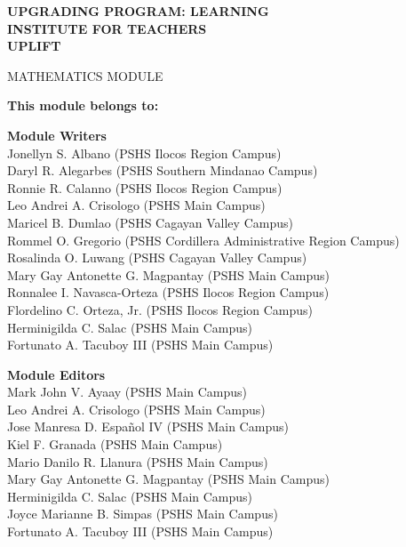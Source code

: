\documentclass[svgnames,a4paper]{report}
\begin{document}
\begin{titlepage}
\begin{center}
\bfseries
{\LARGE UPGRADING PROGRAM: LEARNING}\\[24pt]
{\LARGE INSTITUTE FOR TEACHERS}\\[24pt]
{\LARGE UPLIFT}
\vfill

{\LARGE MATHEMATICS MODULE}
\vfill

\textbf{This module belongs to:}\\[24pt]

\noindent
\hrulefill
\end{center}
\newpage
\thispagestyle{empty}
\vfil
\begin{center}
{\LARGE \bfseries Module Writers}\\[12pt]
Jonellyn S. Albano (PSHS Ilocos Region Campus)\\
Daryl R. Alegarbes (PSHS Southern Mindanao Campus)\\
Ronnie R. Calanno (PSHS Ilocos Region Campus)\\
Leo Andrei A. Crisologo (PSHS Main Campus)\\
Maricel B. Dumlao (PSHS Cagayan Valley Campus)\\
Rommel O. Gregorio (PSHS Cordillera Administrative Region Campus)\\
Rosalinda O. Luwang (PSHS Cagayan Valley Campus)\\
Mary Gay Antonette G. Magpantay (PSHS Main Campus)\\
Ronnalee I. Navasca-Orteza (PSHS Ilocos Region Campus)\\
Flordelino C. Orteza, Jr. (PSHS Ilocos Region Campus)\\
Herminigilda C. Salac (PSHS Main Campus)\\
Fortunato A. Tacuboy III (PSHS Main Campus)
\end{center}
\vfil
\begin{center}
{\LARGE\bfseries Module Editors}\\[12pt]
Mark John V. Ayaay (PSHS Main Campus)\\
Leo Andrei A. Crisologo (PSHS Main Campus)\\
Jose Manresa D. Español IV (PSHS Main Campus)\\
Kiel F. Granada (PSHS Main Campus)\\
Mario Danilo R. Llanura (PSHS Main Campus)\\
Mary Gay Antonette G. Magpantay (PSHS Main Campus)\\
Herminigilda C. Salac (PSHS Main Campus)\\
Joyce Marianne B. Simpas (PSHS Main Campus)\\
Fortunato A. Tacuboy III (PSHS Main Campus)
\end{center}
\newpage
\thispagestyle{empty}


\end{titlepage}
\end{document}
